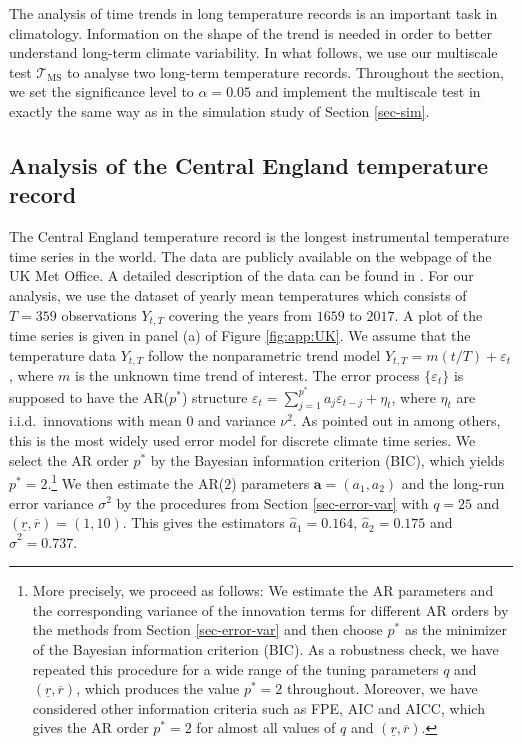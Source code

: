 The analysis of time trends in long temperature records is an important task in climatology. Information on the shape of the trend is needed in order to better understand long-term climate variability. In what follows, we use our multiscale test $\mathcal{T}_{\text{MS}}$ to ana\-lyse two long-term temperature records. Throughout the section, we set the significance level to $\alpha=0.05$ and implement the multiscale test in exactly the same way as in the simulation study of Section \ref{sec-sim}. 


\subsection{Analysis of the Central England temperature record}


The Central England temperature record is the longest instrumental temperature time series in the world. The data are publicly available on the webpage of the UK Met Office. A detailed description of the data can be found in \cite{Parker1992}. For our analysis, we use the dataset of yearly mean temperatures which consists of $T=359$ observations $Y_{t,T}$ covering the years from $1659$ to $2017$. A plot of the time series is given in panel (a) of Figure \ref{fig:app:UK}. We assume that the temperature data $Y_{t,T}$ follow the nonparametric trend model $Y_{t,T} = m(t/T) + \varepsilon_t$, where $m$ is the unknown time trend of interest. The error process $\{ \varepsilon_t \}$ is supposed to have the AR($p^*$) structure $\varepsilon_t = \sum_{j=1}^{p^*} a_j \varepsilon_{t-j} + \eta_t$, where $\eta_t$ are i.i.d.\ innovations with mean $0$ and variance $\nu^2$. As pointed out in \cite{Mudelsee2010} among others, this is the most widely used error model for discrete climate time series. We select the AR order $p^*$ by the Bayesian information criterion (BIC), which yields $p^*=2$.\footnote{More precisely, we proceed as follows: We estimate the AR parameters and the corresponding variance of the innovation terms for different AR orders by the methods from Section \ref{sec-error-var} and then choose $p^*$ as the minimizer of the Bayesian information criterion (BIC). As a robustness check, we have repeated this procedure for a wide range of the tuning parameters $q$ and $(\underline{r},\overline{r})$, which produces the value $p^*=2$ throughout. Moreover, we have considered other information criteria such as FPE, AIC and AICC, which gives the AR order $p^*=2$ for almost all values of $q$ and $(\underline{r},\overline{r})$.} We then estimate the AR($2$) parameters $\boldsymbol{a} = (a_1,a_2)$ and the long-run error variance $\sigma^2$ by the procedures from Section \ref{sec-error-var} with $q = 25$ and $(\underline{r},\overline{r}) = (1,10)$. This gives the estimators $\widehat{a}_1 = 0.164$, $\widehat{a}_2 = 0.175$ and $\widehat{\sigma}^2 = 0.737$.


